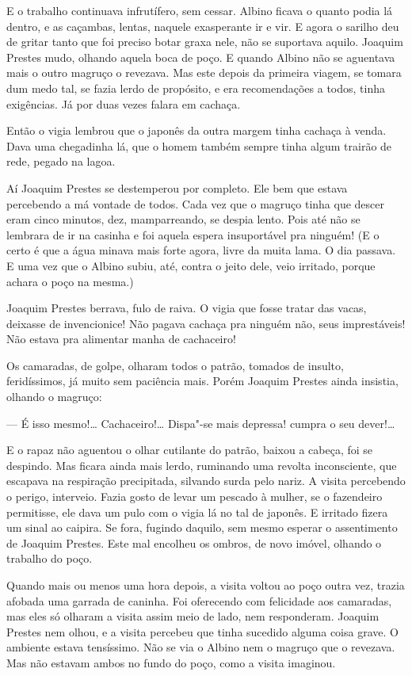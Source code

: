 E o trabalho continuava infrutífero, sem cessar. Albino ficava o quanto
podia lá dentro, e as caçambas, lentas, naquele exasperante ir e vir. E
agora o sarilho deu de gritar tanto que foi preciso botar graxa nele,
não se suportava aquilo. Joaquim Prestes mudo, olhando aquela boca de
poço. E quando Albino não se aguentava mais o outro magruço o revezava.
Mas este depois da primeira viagem, se tomara dum medo tal, se fazia
lerdo de propósito, e era recomendações a todos, tinha exigências. Já
por duas vezes falara em cachaça.

Então o vigia lembrou que o japonês da outra margem tinha cachaça à
venda. Dava uma chegadinha lá, que o homem também sempre tinha algum
trairão de rede, pegado na lagoa.

Aí Joaquim Prestes se destemperou por completo. Ele bem que estava
percebendo a má vontade de todos. Cada vez que o magruço tinha que
descer eram cinco minutos, dez, mamparreando, se despia lento. Pois até
não se lembrara de ir na casinha e foi aquela espera insuportável pra
ninguém! (E o certo é que a água minava mais forte agora, livre da muita
lama. O dia passava. E uma vez que o Albino subiu, até, contra o jeito
dele, veio irritado, porque achara o poço na mesma.)

Joaquim Prestes berrava, fulo de raiva. O vigia que fosse tratar das
vacas, deixasse de invencionice! Não pagava cachaça pra ninguém não,
seus imprestáveis! Não estava pra alimentar manha de cachaceiro!

Os camaradas, de golpe, olharam todos o patrão, tomados de insulto,
feridíssimos, já muito sem paciência mais. Porém Joaquim Prestes ainda
insistia, olhando o magruço:

--- É isso mesmo!\ldots{} Cachaceiro!\ldots{} Dispa"-se mais depressa! cumpra o seu
dever!\ldots{}

E o rapaz não aguentou o olhar cutilante do patrão, baixou a cabeça, foi
se despindo. Mas ficara ainda mais lerdo, ruminando uma revolta
inconsciente, que escapava na respiração precipitada, silvando surda
pelo nariz. A visita percebendo o perigo, interveio. Fazia gosto de
levar um pescado à mulher, se o fazendeiro permitisse, ele dava um pulo
com o vigia lá no tal de japonês. E irritado fizera um sinal ao caipira.
Se fora, fugindo daquilo, sem mesmo esperar o assentimento de Joaquim
Prestes. Este mal encolheu os ombros, de novo imóvel, olhando o trabalho
do poço.

Quando mais ou menos uma hora depois, a visita voltou ao poço outra vez,
trazia afobada uma garrada de caninha. Foi oferecendo com felicidade aos
camaradas, mas eles só olharam a visita assim meio de lado, nem
responderam. Joaquim Prestes nem olhou, e a visita percebeu que tinha
sucedido alguma coisa grave. O ambiente estava tensíssimo. Não se via o
Albino nem o magruço que o revezava. Mas não estavam ambos no fundo do
poço, como a visita imaginou.

